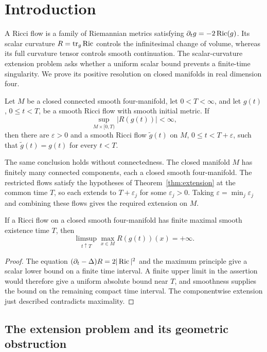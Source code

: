 \section{Introduction}\label{sec:introduction}

A Ricci flow is a family of Riemannian metrics satisfying
\(\partial_tg=-2\operatorname{Ric}(g)\). Its scalar curvature \(R=\operatorname{tr}_g\operatorname{Ric}\)
controls the infinitesimal change of volume, whereas its full curvature
tensor controls smooth continuation. The scalar-curvature extension
problem asks whether a uniform scalar bound prevents a finite-time
singularity. We prove its positive resolution on closed manifolds in
real dimension four.

\begin{theorem}\label{thm:extension}
Let \(M\) be a closed connected smooth four-manifold, let
\(0<T<\infty\), and let \(g(t)\), \(0\le t<T\), be a smooth Ricci
flow with smooth initial metric. If
\[
 \sup_{M\times[0,T)}|R(g(t))|<\infty,
\]
then there are \(\varepsilon>0\) and a smooth Ricci flow
\(\widetilde g(t)\) on \(M\), \(0\le t<T+\varepsilon\), such that
\(\widetilde g(t)=g(t)\) for every \(t<T\).
\end{theorem}

The same conclusion holds without connectedness. The closed manifold
\(M\) has finitely many connected components, each a closed smooth
four-manifold. The restricted flows satisfy the hypotheses of
Theorem~\ref{thm:extension} at the common time \(T\), so each extends
to \(T+\varepsilon_j\) for some \(\varepsilon_j>0\). Taking
\(\varepsilon=\min_j\varepsilon_j\) and combining these flows gives
the required extension on \(M\).

\begin{corollary}\label{cor:scalar-blowup}
If a Ricci flow on a closed smooth four-manifold has finite maximal
smooth existence time \(T\), then
\[
 \limsup_{t\uparrow T}\max_{x\in M}R(g(t))(x)=+\infty.
\]
\end{corollary}

\begin{proof}
The equation \((\partial_t-\Delta)R=2|\operatorname{Ric}|^2\) and the maximum
principle give a scalar lower bound on a finite time interval. A finite
upper limit in the assertion would therefore give a uniform absolute
bound near \(T\), and smoothness supplies the bound on the remaining
compact time interval. The componentwise extension just described
contradicts maximality.
\end{proof}

\subsection{The extension problem and its geometric obstruction}

